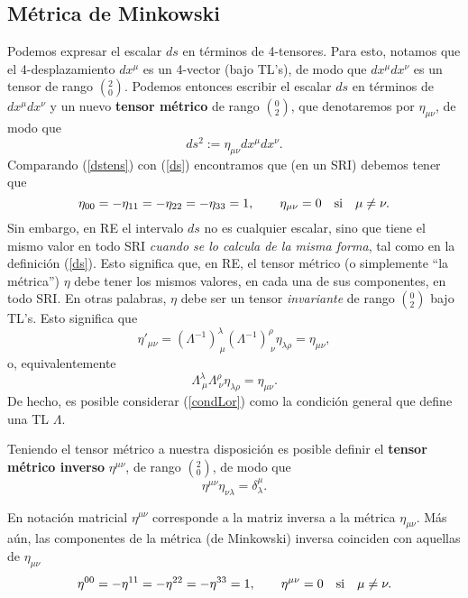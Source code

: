 \subsection{Métrica de Minkowski}
Podemos expresar el escalar $ds$ en términos de 4-tensores. Para esto, notamos
que el 4-desplazamiento $dx^\mu$ es un 4-vector (bajo TL's), de modo que
$dx^\mu dx^\nu$ es un tensor de rango $(^2_0)$. Podemos entonces escribir
el escalar $ds$ en términos de $dx^\mu dx^\nu$ y un nuevo \textbf{tensor
métrico} de rango $(^0_2)$, que denotaremos por $\eta_{\mu\nu}$, de modo que
\begin{equation}
ds^2:=\eta_{\mu\nu}dx^\mu dx^\nu. \label{dstens}
\end{equation}
Comparando (\ref{dstens}) con (\ref{ds}) encontramos que (en un SRI)
debemos tener que
\begin{equation}
\eta_{00}=-\eta_{11}=-\eta_{22}=-\eta_{33}=1, \qquad \eta_{\mu\nu}=0
\quad\rm{si}\quad \mu\neq\nu .
\end{equation}
Sin embargo, en RE el intervalo $ds$ no es cualquier escalar, sino que tiene el mismo valor en todo SRI \textit{cuando se lo calcula de la misma forma}, tal como en la definición (\ref{ds}). Esto significa que, en RE, el tensor métrico (o simplemente ``la métrica'') $\eta$ debe tener los mismos valores, en cada una de sus componentes, en todo SRI. En  otras palabras, $\eta$ debe ser un tensor \textit{invariante} de rango $(^0_2)$ bajo TL's. Esto significa que
\begin{equation}
\eta'_{\mu\nu}=\left( \Lambda^{-1}\right)^{\lambda}_{\ \mu}\left(
\Lambda^{-1}\right)^{\rho}_{\ \nu}\eta_{\lambda\rho}=\eta_{\mu\nu},
\end{equation}
o, equivalentemente
\begin{equation}
\boxed{\Lambda^\lambda_{\ \mu}\Lambda^\rho_{\ \nu}\eta_{\lambda\rho}=\eta_{\mu\nu}.}
\label{condLor}
\end{equation}
De hecho, es posible considerar (\ref{condLor}) como la condición general que define una TL $\Lambda$.

Teniendo el tensor métrico a nuestra disposición es posible definir el \textbf{tensor métrico inverso} $\eta^{\mu\nu}$, de rango $(^2_0)$, de modo que
\begin{equation}
\boxed{\eta^{\mu\nu}\eta_{\nu\lambda}=\delta^\mu_\lambda .}\label{definv}
\end{equation}

En notación matricial $\eta^{\mu\nu}$ corresponde a la matriz inversa a la
métrica $\eta_{\mu\nu}$. Más aún, las componentes de la métrica (de
Minkowski) inversa coinciden con aquellas de $\eta_{\mu\nu}$
\begin{equation}
\eta^{00}=-\eta^{11}=-\eta^{22}=-\eta^{33}=1, \qquad \eta^{\mu\nu}=0
\quad\rm{si}\quad \mu\neq\nu .
\end{equation}

